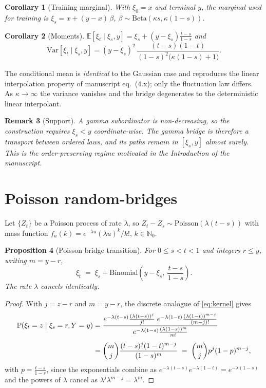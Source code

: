 \documentclass[11pt,a4paper]{article}
\newtheorem{prop}{Proposition}
\newtheorem{coro}[prop]{Corollary}
\newtheorem{rem}[prop]{Remark}
\def\N{\mathbb{N}}
\def\E{\mathbb{E}}
\def\P{\mathbb{P}}
\begin{document}
\begin{coro}[Training marginal]
With $\xi_0=x$ and terminal $y$, the marginal used for training is
$\xi_s = x+(y-x)\,\beta$, $\beta\sim\mathrm{Beta}(\kappa s,\kappa(1-s))$.
\end{coro}

\begin{coro}[Moments]
\label{coro:gammamoments}
$\E[\xi_t\mid \xi_s,y]=\xi_s+(y-\xi_s)\frac{t-s}{1-s}$ and
\begin{equation}
\mathrm{Var}[\xi_t\mid \xi_s,y]=(y-\xi_s)^2\,
\frac{(t-s)(1-t)}{(1-s)^2\big(\kappa(1-s)+1\big)} .
\end{equation}
\end{coro}

The conditional mean is \emph{identical} to the Gaussian case and reproduces the
linear interpolation property of manuscript eq.~(4.x); only the fluctuation law
differs. As $\kappa\to\infty$ the variance vanishes and the bridge degenerates to
the deterministic linear interpolant.

\begin{rem}[Support]
A gamma subordinator is non-decreasing, so the construction requires
$\xi_s<y$ coordinate-wise. The gamma bridge is therefore a transport between
\emph{ordered} laws, and its paths remain in $[\xi_s,y]$ almost surely. This is the
order-preserving regime motivated in the Introduction of the manuscript.
\end{rem}

\section{Poisson random-bridges}

Let $\{Z_t\}$ be a Poisson process of rate $\lambda$, so
$Z_t-Z_s\sim\mathrm{Poisson}(\lambda(t-s))$ with mass function
$f_u(k)=e^{-\lambda u}(\lambda u)^k/k!$, $k\in\N_0$.

\begin{prop}[Poisson bridge transition]
\label{prop:poisson}
For $0\le s<t<1$ and integers $r\le y$, writing $m=y-r$,
\begin{equation}
\xi_t \;=\; \xi_s + \mathrm{Binomial}\!\left(y-\xi_s,\ \frac{t-s}{1-s}\right).
\end{equation}
The rate $\lambda$ cancels identically.
\end{prop}

\begin{proof}
With $j=z-r$ and $m=y-r$, the discrete analogue of \eqref{eq:kernel} gives
\begin{align}
\P(\xi_t=z\mid \xi_s=r, Y=y)
&=\frac{e^{-\lambda(t-s)}\frac{(\lambda(t-s))^{j}}{j!}\;
        e^{-\lambda(1-t)}\frac{(\lambda(1-t))^{m-j}}{(m-j)!}}
       {e^{-\lambda(1-s)}\frac{(\lambda(1-s))^{m}}{m!}} \notag\\[4pt]
&=\binom{m}{j}\frac{(t-s)^{j}(1-t)^{m-j}}{(1-s)^{m}}
\;=\;\binom{m}{j}p^{j}(1-p)^{m-j},
\end{align}
with $p=\frac{t-s}{1-s}$, since the exponentials combine as
$e^{-\lambda(t-s)}e^{-\lambda(1-t)}=e^{-\lambda(1-s)}$ and the powers of $\lambda$
cancel as $\lambda^{j}\lambda^{m-j}=\lambda^{m}$.
\end{proof}
\end{document}

